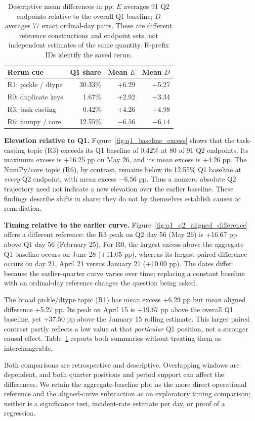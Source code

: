 \begin{table}[t]
\centering
\small
\begin{tabular}{lrrr}
\toprule
\textbf{Rerun cue} & \textbf{Q1 share} & \textbf{Mean $E$} & \textbf{Mean $D$} \\
\midrule
R1: pickle / dtype & 30.33\% & +6.29 & +5.27 \\
R0: duplicate keys & 1.67\% & +2.92 & +3.34 \\
R3: task casting & 0.42\% & +4.26 & +4.98 \\
R6: numpy / core & 12.55\% & $-6.56$ & $-6.14$ \\
\bottomrule
\end{tabular}
\caption{Descriptive mean differences in pp: $E$ averages 91 Q2 endpoints relative to the overall Q1 baseline; $D$ averages 77 exact ordinal-day pairs. These are different reference constructions and endpoint sets, not independent estimates of the same quantity. R-prefix IDs identify the saved rerun.}
\label{tab:q1_q2_comparisons}
\end{table}

\textbf{Elevation relative to Q1.} Figure~\ref{fig:q1_baseline_excess} shows that the task-casting topic (R3) exceeds its Q1 baseline of 0.42\% at 80 of 91 Q2 endpoints. Its maximum excess is +16.25 pp on May 26, and its mean excess is +4.26 pp. The NumPy/core topic (R6), by contrast, remains below its 12.55\% Q1 baseline at \emph{every} Q2 endpoint, with mean excess $-6.56$ pp. Thus a nonzero absolute Q2 trajectory need not indicate a new elevation over the earlier baseline. These findings describe shifts in share; they do not by themselves establish causes or remediation.

\textbf{Timing relative to the earlier curve.} Figure~\ref{fig:q1_q2_aligned_difference} offers a different reference: the R3 peak on Q2 day 56 (May 26) is +16.67 pp above Q1 day 56 (February 25). For R0, the largest excess above the aggregate Q1 baseline occurs on June 28 (+11.05 pp), whereas its largest paired difference occurs on day 21, April 21 versus January 21 (+10.00 pp). The dates differ because the earlier-quarter curve varies over time; replacing a constant baseline with an ordinal-day reference changes the question being asked.

The broad pickle/dtype topic (R1) has mean excess +6.29 pp but mean aligned difference +5.27 pp. Its peak on April 15 is +19.67 pp above the overall Q1 baseline, yet +37.50 pp above the January 15 rolling estimate. This larger paired contrast partly reflects a low value at that \emph{particular} Q1 position, not a stronger causal effect. Table~\ref{tab:q1_q2_comparisons} reports both summaries without treating them as interchangeable.

Both comparisons are retrospective and descriptive. Overlapping windows are dependent, and both quarter positions and period support can affect the differences. We retain the aggregate-baseline plot as the more direct operational reference and the aligned-curve subtraction as an exploratory timing comparison; neither is a significance test, incident-rate estimate per day, or proof of a regression.
